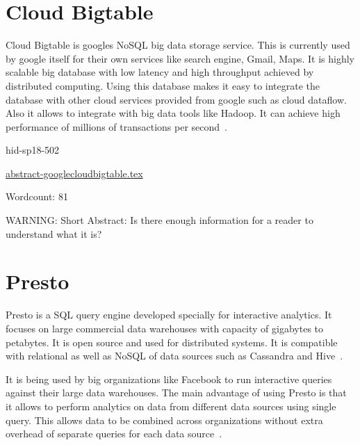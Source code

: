 \section{Cloud Bigtable}

Cloud Bigtable is googles NoSQL big data storage service. This is currently
used by google itself for their own services like search engine, Gmail, Maps.
It is highly scalable big database with low latency and high throughput achieved
by distributed computing. Using this database makes it easy to integrate the
database with other cloud services provided from google such as cloud dataflow.
Also it allows to integrate with big data tools like Hadoop. It can achieve high 
performance of millions of transactions per  
second~\cite{hid-sp18-502-GoogleCloudBigtable}.





\begin{IU}

hid-sp18-502

\href{https://github.com/cloudmesh-community/hid-sp18-502/blob/master//technology/abstract-googlecloudbigtable.tex}{abstract-googlecloudbigtable.tex}

 

Wordcount: 81

WARNING: Short Abstract: Is there enough information for a reader to understand what it is?

\end{IU}

\section{Presto}

Presto is a SQL query engine developed specially for interactive analytics. It
focuses on large commercial data warehouses with capacity of gigabytes to
petabytes. It is open source and used for distributed systems. It is compatible
with relational as well as NoSQL of data sources such as Cassandra and 
Hive~\cite{hid-sp18-502-Presto}.

It is being used by big organizations like Facebook to run interactive queries
against their large data warehouses. The main advantage of using Presto is that
it allows to perform analytics on data from different data sources using single
query. This allows data to be combined across organizations without extra
overhead of separate queries for each data source~\cite{hid-sp18-502-Presto}.



